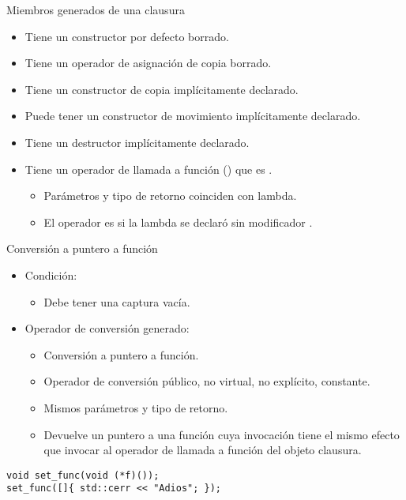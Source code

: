 \begin{frame}{Miembros generados de una clausura}
  \begin{itemize}
    \item Tiene un constructor por defecto borrado.
    \item Tiene un operador de asignación de copia borrado.
    \item Tiene un constructor de copia implícitamente declarado.
    \item Puede tener un constructor de movimiento implícitamente declarado.
    \item Tiene un destructor implícitamente declarado.
    \item Tiene un operador de llamada a función () que es .
      \begin{itemize}
        \item Parámetros y tipo de retorno coinciden con lambda.
        \item El operador es  si la lambda se declaró sin modificador .
      \end{itemize}
  \end{itemize}
\end{frame}

\begin{frame}[t,fragile]{Conversión a puntero a función}
  \begin{itemize}
    \item Condición:
      \begin{itemize}
        \item Debe tener una captura vacía.
      \end{itemize}
    \item Operador de conversión generado:
      \begin{itemize}
        \item Conversión a puntero a función.
        \item Operador de conversión público, no virtual, no explícito, constante.
        \item Mismos parámetros y tipo de retorno.
        \item Devuelve un puntero a una función cuya invocación tiene el mismo efecto que invocar al 
        operador de llamada a función del objeto clausura.
      \end{itemize}
  \end{itemize}
\begin{lstlisting}
void set_func(void (*f)());
set_func([]{ std::cerr << "Adios"; });
\end{lstlisting}
\end{frame}

